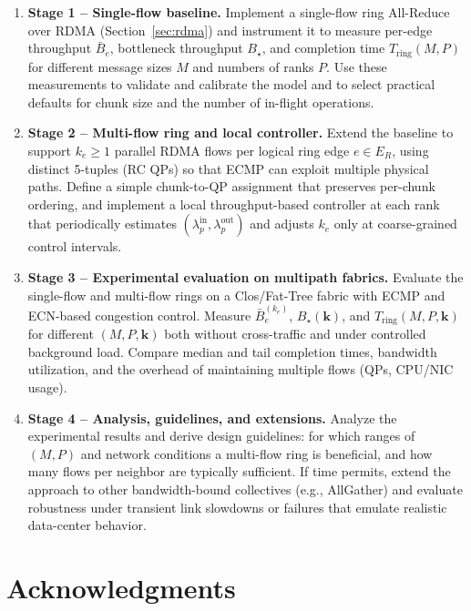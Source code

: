 \documentclass[12pt]{article}
\begin{document}
\begin{enumerate}[leftmargin=*]
  \item \textbf{Stage 1 – Single-flow baseline.}
        Implement a single-flow ring All-Reduce over RDMA
        (Section~\ref{sec:rdma}) and instrument it to measure
        per-edge throughput $\bar{B}_e$, bottleneck throughput $B_\star$, and
        completion time $T_{\text{ring}}(M,P)$ for different message sizes $M$
        and numbers of ranks $P$. Use these measurements to validate and
        calibrate the model and to select practical defaults for chunk size
        and the number of in-flight operations.

  \item \textbf{Stage 2 – Multi-flow ring and local controller.}
        Extend the baseline to support $k_e \ge 1$ parallel RDMA flows per
        logical ring edge $e \in E_R$, using distinct 5-tuples (RC QPs) so that
        ECMP can exploit multiple physical paths. Define a simple chunk-to-QP
        assignment that preserves per-chunk ordering, and implement a local
        throughput-based controller at each rank that periodically estimates
        $(\lambda_p^{\mathrm{in}},\lambda_p^{\mathrm{out}})$ and adjusts $k_e$
        only at coarse-grained control intervals.

  \item \textbf{Stage 3 – Experimental evaluation on multipath fabrics.}
        Evaluate the single-flow and multi-flow rings on a Clos/Fat-Tree fabric
        with ECMP and ECN-based congestion control. Measure
        $\bar{B}_e^{(k_e)}$, $B_\star(\mathbf{k})$, and
        $T_{\text{ring}}(M,P,\mathbf{k})$ for different $(M,P,\mathbf{k})$
        both without cross-traffic and under controlled background load.
        Compare median and tail completion times, bandwidth utilization, and
        the overhead of maintaining multiple flows (QPs, CPU/NIC usage).

  \item \textbf{Stage 4 – Analysis, guidelines, and extensions.}
        Analyze the experimental results and derive design guidelines:
        for which ranges of $(M,P)$ and network conditions a multi-flow ring is
        beneficial, and how many flows per neighbor are typically sufficient.
        If time permits, extend the approach to other bandwidth-bound
        collectives (e.g., AllGather) and evaluate robustness under transient
        link slowdowns or failures that emulate realistic data-center behavior.
\end{enumerate}



\newpage
\section*{Acknowledgments}
\printbibliography
\end{document}
